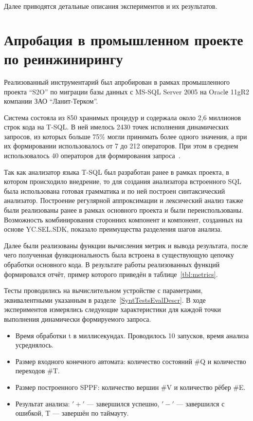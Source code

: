 Далее приводятся детальные описания экспериментов и их результатов.


\section{Апробация в промышленном проекте по реинжинирингу}

Реализованный инструментарий был апробирован в рамках промышленного проекта ``S2O'' по миграции базы данных с MS-SQL Server 2005 на Oraclе 11gR2 компании ЗАО ``Ланит-Терком''.

Система состояла из 850 хранимых процедур и содержала около 2,6 миллионов строк кода на T-SQL. В ней имелось 2430 точек исполнения динамических запросов, из которых больше 75\% могли принимать более 
одного значения, а при их формировании использовалось от 7 до 212 операторов. При этом в среднем использовалось 40 операторов для формирования запроса~\cite{Syrcose}.

Так как анализатор языка T-SQL был разработан ранее в рамках проекта, в котором происходило внедрение, то для создания анализатора встроенного SQL была использована готовая грамматика и по ней построен 
синтаксический анализатор. Построение регулярной аппроксимации и лексический анализ также были реализованы ранее в рамках основного проекта и были переиспользованы. Возможность комбинирования сторонних компонент 
и компонент, созданных на основе YC.SEL.SDK, показало преимущества разделения шагов анализа.

Далее были реализованы функции вычисления метрик и вывода результата, после чего полученная функциональность была встроена в существующую цепочку обработки основного кода. В результате работы реализованных функций формировался отчёт, пример которого приведён в таблице~\ref{tbl:metrics}.

Тесты проводились на вычислительном устройстве с параметрами, эквивалентными указанным в разделе~\ref{SyntTestsEvalDescr}. В ходе экспериментов измерялись следующие характеристики для каждой точки выполнения динамически формируемого запроса.

\begin{itemize}
  \item Время обработки t в миллисекундах. Проводилось 10 запусков, время анализа усреднялось. 
  \item Размер входного конечного автомата: количество состояний \#Q и количество переходов \#T.
  \item Размер построенного SPPF: количество вершин \#V и количество рёбер \#E.
  \item Результат анализа: $'+'$ --- завершился успешно, $'-'$ --- завершился с ошибкой, T --- завершён по таймауту.
\end{itemize} 


